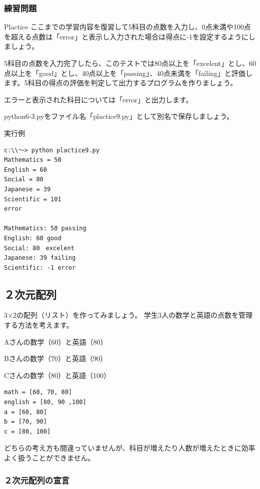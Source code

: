 \documentclass[11pt,a4paper,dvipdfmx,titlepage]{jsreport}
\begin{document}
\subsubsection{練習問題}
\begin{plabox}{Plactice}
ここまでの学習内容を復習して5科目の点数を入力し、0点未満や100点を超える点数は「error」と表示し入力された場合は得点に-1を設定するようにしましょう。

5科目の点数を入力完了したら、このテストでは80点以上を「excelent」とし、60点以上を「good」とし、40点以上を「passing」、40点未満を「failing」と評価します。5科目の得点の評価を判定して出力するプログラムを作りましょう。

エラーと表示された科目については「error」と出力します。

python6-3.pyをファイル名「plactice9.py」として別名で保存しましょう。

\begin{codebox}{実行例}
\begin{verbatim}
c:\\～> python plactice9.py
Mathematics = 50
English = 60
Social = 80
Japanese = 39
Scientific = 101
error

Mathematics: 50 passing
English: 60 good
Social: 80　excelent
Japanese: 39 failing
Scientific: -1 error
\end{verbatim}
\end{codebox}
\end{plabox}

\subsection{２次元配列}


3×2の配列（リスト）を作ってみましょう。
学生3人の数学と英語の点数を管理する方法を考えます。
\begin{description}
\item Aさんの数学（60）と英語（80）
\item Bさんの数学（70）と英語（90）
\item Cさんの数学（80）と英語（100）
\end{description}

\begin{verbatim}
math = [60, 70, 80]
english = [80, 90 ,100]
a = [60, 80]
b = [70, 90]
c = [80, 100]
\end{verbatim}

どちらの考え方も間違っていませんが、科目が増えたり人数が増えたときに効率よく扱うことができません。
\newpage
\subsubsection{２次元配列の宣言}
\end{document}

